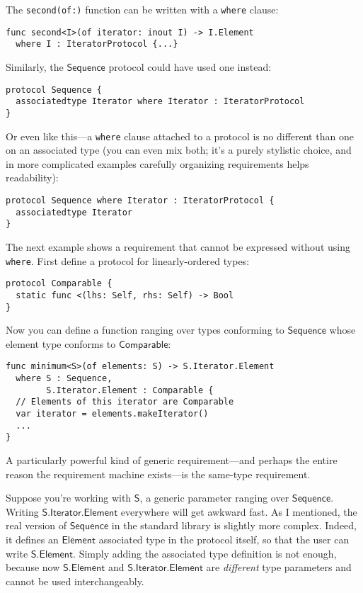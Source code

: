 \documentclass[headsepline,bibliography=totoc]{scrreport}
\newcommand{\namesym}[1]{\mathsf{#1}}
\newcommand{\genericparam}[1]{\bm{\mathsf{#1}}}
\newcommand{\proto}[1]{\bm{\mathsf{#1}}}
\theoremstyle{definition}
\theoremstyle{definition}
\theoremstyle{definition}
\begin{document}
\eject
The \texttt{second(of:)} function can be written with a \texttt{where} clause:
\begin{Verbatim}
func second<I>(of iterator: inout I) -> I.Element
  where I : IteratorProtocol {...}
\end{Verbatim}
Similarly, the $\proto{Sequence}$ protocol could have used one instead:
\begin{Verbatim}
protocol Sequence {
  associatedtype Iterator where Iterator : IteratorProtocol
}
\end{Verbatim}
Or even like this---a \texttt{where} clause attached to a protocol is no different than one on an associated type (you can even mix both; it's a purely stylistic choice, and in more complicated examples carefully organizing requirements helps readability):
\begin{Verbatim}
protocol Sequence where Iterator : IteratorProtocol {
  associatedtype Iterator
}
\end{Verbatim}

The next example shows a requirement that cannot be expressed without using \texttt{where}. First define a protocol for linearly-ordered types:
\begin{Verbatim}
protocol Comparable {
  static func <(lhs: Self, rhs: Self) -> Bool
}
\end{Verbatim}
Now you can define a function ranging over types conforming to $\proto{Sequence}$ whose element type conforms to $\proto{Comparable}$:
\begin{Verbatim}
func minimum<S>(of elements: S) -> S.Iterator.Element
  where S : Sequence,
        S.Iterator.Element : Comparable {
  // Elements of this iterator are Comparable
  var iterator = elements.makeIterator()
  ...
}
\end{Verbatim}
A particularly powerful kind of generic requirement---and perhaps the entire reason the requirement machine exists---is the same-type requirement.

Suppose you're working with $\genericparam{S}$, a generic parameter ranging over $\proto{Sequence}$. Writing $\genericparam{S}.\namesym{Iterator}.\namesym{Element}$ everywhere will get awkward fast. As I mentioned, the real version of $\proto{Sequence}$ in the standard library is slightly more complex. Indeed, it defines an $\namesym{Element}$ associated type in the protocol itself, so that the user can write $\genericparam{S}.\namesym{Element}$. Simply adding the associated type definition is not enough, because now $\genericparam{S}.\namesym{Element}$ and $\genericparam{S}.\namesym{Iterator}.\namesym{Element}$ are \emph{different} type parameters and cannot be used interchangeably.
\end{document}
